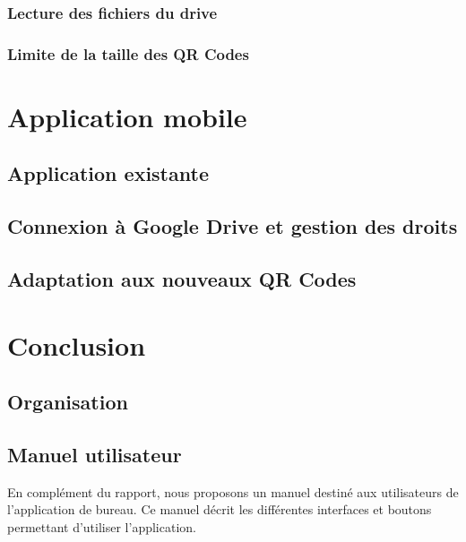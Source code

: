 \documentclass{report}
\begin{document}
		\newpage
		\subsection{Lecture des fichiers du drive}
			 \label{lectureDrive}
			
		\subsection{Limite de la taille des QR Codes}
			 \label{limiteTaille}

\chapter{Application mobile}

	\section{Application existante}
		
		
	\section{Connexion à Google Drive et gestion des droits}
		

	\section{Adaptation aux nouveaux QR Codes}
		

\chapter{Conclusion}
	



\addappheadtotoc
\appendixpage

\appendix

\section{Organisation}

	
				

\section{Manuel utilisateur}
\par En complément du rapport, nous proposons un manuel destiné aux utilisateurs de l'application de bureau. Ce manuel décrit les différentes interfaces et boutons permettant d'utiliser l'application.

	
\end{document}
